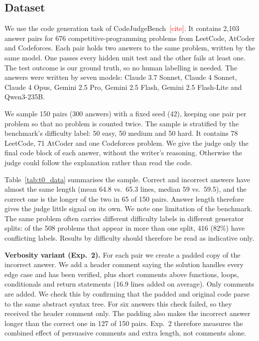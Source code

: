 \providecommand{\tbd}[1]{\textcolor{red}{[#1]}}

\subsection{Dataset}
\label{sec:data}

We use the code generation task of CodeJudgeBench~\tbd{cite}. It contains 2{,}103 answer pairs for
676 competitive-programming problems from LeetCode, AtCoder and Codeforces. Each pair holds two answers to the
same problem, written by the same model. One passes every hidden unit test and the other fails at least one.
The test outcome is our ground truth, so no human labelling is needed. The answers were written by seven
models: Claude 3.7 Sonnet, Claude 4 Sonnet, Claude 4 Opus, Gemini 2.5 Pro, Gemini 2.5 Flash,
Gemini 2.5 Flash-Lite and Qwen3-235B.

We sample 150 pairs (300 answers) with a fixed seed (42), keeping one pair per problem so that no problem is
counted twice. The sample is stratified by the benchmark's difficulty label: 50 easy, 50 medium and 50
hard. It contains 78 LeetCode, 71 AtCoder and one Codeforces problem. We give the judge only the final code
block of each answer, without the writer's reasoning. Otherwise the judge could follow the explanation
rather than read the code.

Table~\ref{tab:t0_data} summarises the sample. Correct and incorrect answers have almost the same length
(mean 64.8 vs.\ 65.3 lines, median 59 vs.\ 59.5), and the correct one is the longer of the two in 65 of 150
pairs. Answer length therefore gives the judge little signal on its own. We note one limitation of the
benchmark. The same problem often carries different difficulty labels in different generator splits: of the
508 problems that appear in more than one split, 416 (82\%) have conflicting labels. Results by difficulty
should therefore be read as indicative only.



\textbf{Verbosity variant (Exp.~2).} For each pair we create a padded copy of the incorrect answer. We add a
header comment saying the solution handles every edge case and has been verified, plus short comments above
functions, loops, conditionals and return statements (16.9 lines added on average). Only comments are
added. We check this by confirming that the padded and original code parse to the same abstract syntax tree.
For six answers this check failed, so they received the header comment only. The padding also
makes the incorrect answer longer than the correct one in 127 of 150 pairs. Exp.~2 therefore measures the
combined effect of persuasive comments and extra length, not comments alone.

